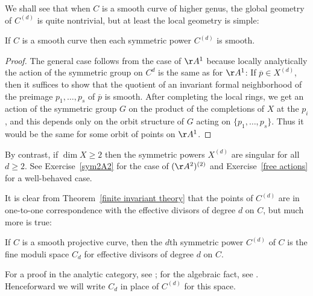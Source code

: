 We shall see that when $C$ is a smooth curve of higher genus, the global geometry of $C^{(d)}$ is quite nontrivial, but at least
the local geometry is simple:

\begin{proposition}
If $C$ is a smooth curve then each symmetric power $C^{(d)}$ is smooth.
\end{proposition}

\begin{proof}
 The general case follows from the case of $\AA^{1}$ because locally analytically the action of the symmetric group on $C^d$ is the same as for $\AA^1$: If  $\overline p \in X^{(d)}$, then it suffices to
 show that the quotient of an invariant formal neighborhood of the preimage $p_1,\dots, p_s$ of
 $\overline p$ is smooth. After completing the local rings, we get an action of the symmetric group
 $G$ on the product of the completions of $X$ at the $p_i$, and this depends only on the orbit
 structure of $G$ acting on $\{p_1,\dots, p_s\}$. Thus it would be the same for some orbit of
 points on $\AA^1$.
 \end{proof}

By contrast, if $\dim X \geq 2$ then the symmetric powers $X^{(d)}$ are singular for all $d \geq 2$.
See Exercise~\ref{sym2A2} for the case of $(\AA^2)^{(2)}$ and Exercise~\ref{free actions} for a well-behaved case.

It is clear from Theorem~\ref{finite invariant theory} that the points of $C^{(d)}$ are in one-to-one correspondence with the effective divisors of
degree $d$ on $C$, but much more is true:

\begin{theorem}
 If $C$ is a smooth projective curve, then the $d$th symmetric power $C^{(d)}$ of $C$ is the fine moduli space $C_d$ for effective divisors of degree $d$ on $C$.
\end{theorem}
For a proof in the analytic category, see \cite[]{ACGH}; for the algebraic fact, see \cite[Remark 9.3.9]{Kleiman-PicardScheme}.
Henceforward we will write $C_d$ in place of $C^(d)$ for this space.


%
%

